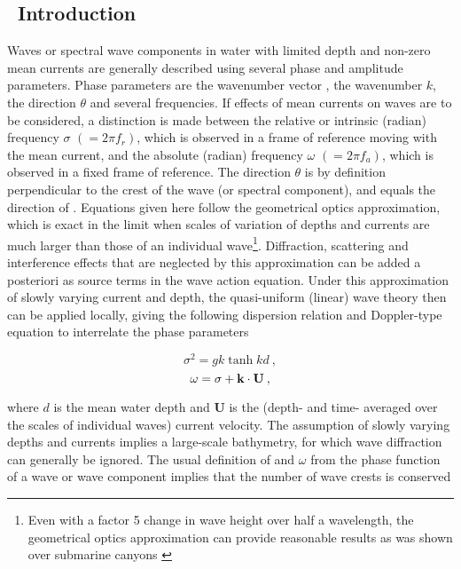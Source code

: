 \vssub
\subsection{~Introduction} \label{sec:intro}
\vssub

Waves or spectral wave components in water with limited depth and non-zero
mean currents are generally described using several phase and amplitude
parameters. Phase parameters are the wavenumber vector {\bk}, the wavenumber
$k$, the direction $\theta$ and several frequencies. If effects of mean
currents on waves are to be considered, a distinction is made between the
relative or intrinsic (radian) frequency $\sigma$ $(= 2 \pi f_r)$, which is
observed in a frame of reference moving with the mean current, and the
absolute (radian) frequency $\omega$ $(= 2 \pi f_a)$, which is observed in a
fixed frame of reference.  The direction $\theta$ is by definition
perpendicular to the crest of the wave (or spectral component), and equals the
direction of {\bk}. Equations given here follow the geometrical optics approximation, 
which is exact in the limit when scales of variation of depths and currents are
 much larger than those of an individual wave\footnote{Even with a factor 5 change in wave height over half a wavelength, 
 the geometrical optics approximation can provide reasonable results as was shown over submarine canyons \citep{art:Mea07}}. 
 Diffraction, scattering and interference effects that are neglected by this approximation can be 
 added a posteriori as source terms in the wave action equation. Under this approximation of slowly varying 
 current and depth, the quasi-uniform
(linear) wave theory then can be applied locally, giving the following
dispersion relation and Doppler-type equation to interrelate the phase
parameters


\begin{equation}
\sigma ^2 = g k \tanh kd \: ,
\label{eq:disp}
\end{equation}
\begin{equation}
\omega = \sigma + {\bk} \cdot {\bf U} \: ,
\label{eq:doppler}
\end{equation}

\noindent 
where $d$ is the mean water depth and {\bf U} is the (depth- and time-
averaged over the scales of individual waves) current velocity. The assumption
of slowly varying depths and currents implies a large-scale bathymetry, for
which wave diffraction can generally be ignored. The usual definition of {\bk}
and $\omega$ from the phase function of a wave or wave component implies that
the number of wave crests is conserved \citep[see, e.g.,][]{bk:Phi77,bk:Mei83}

